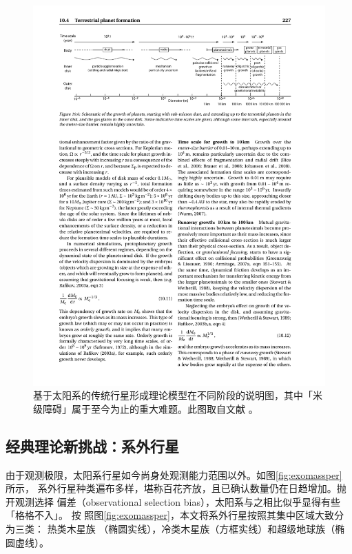 \begin{figure}[h!]
\centering
\includegraphics[width=1.0\textwidth]{figures/chapter1/fig12_pfsequence.pdf}
\caption[基于太阳系的传统行星形成理论模型在不同阶段的说明图，其中「米级障碍」属于至今为止的重大难题。图片版权 Michael Perryman。]{基于太阳系的传统行星形成理论模型在不同阶段的说明图，其中「米级障碍」属于至今为止的重大难题。此图取自文献 。}
\label{fig:pfstage}
\end{figure}

\subsection{经典理论新挑战：系外行星} \label{sec: exopftheory}

由于观测极限，太阳系行星如今尚身处观测能力范围以外。如图\ref{fig:exomassper} 所示，
系外行星种类遍布多样，堪称百花齐放，且已确认数量仍在日趋增加。抛开观测选择
偏差（observational selection bias），太阳系与之相比似乎显得有些「格格不入」。 按
照图\ref{fig:exomassper}，本文将系外行星按照其集中区域大致分为三类： 热类木星族
（椭圆实线），冷类木星族（方框实线）和超级地球族（椭圆虚线）。

